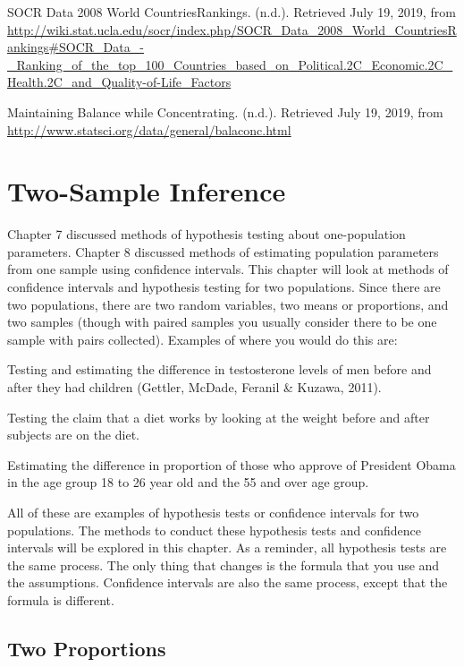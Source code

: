 \documentclass[
]{book}
\begin{document}
SOCR Data 2008 World CountriesRankings. (n.d.). Retrieved July 19, 2019, from \url{http://wiki.stat.ucla.edu/socr/index.php/SOCR_Data_2008_World_CountriesRankings\#SOCR_Data_-_Ranking_of_the_top_100_Countries_based_on_Political.2C_Economic.2C_Health.2C_and_Quality-of-Life_Factors}

Maintaining Balance while Concentrating. (n.d.). Retrieved July 19, 2019, from \url{http://www.statsci.org/data/general/balaconc.html}

\hypertarget{two-sample-inference}{%
\chapter{Two-Sample Inference}\label{two-sample-inference}}

Chapter 7 discussed methods of hypothesis testing about one-population parameters. Chapter 8 discussed methods of estimating population parameters from one sample using confidence intervals. This chapter will look at methods of confidence intervals and hypothesis testing for two populations. Since there are two populations, there are two random variables, two means or proportions, and two samples (though with paired samples you usually consider there to be one sample with pairs collected). Examples of where you would do this are:

Testing and estimating the difference in testosterone levels of men before and after they had children (Gettler, McDade, Feranil \& Kuzawa, 2011).

Testing the claim that a diet works by looking at the weight before and after subjects are on the diet.

Estimating the difference in proportion of those who approve of President Obama in the age group 18 to 26 year old and the 55 and over age group.

All of these are examples of hypothesis tests or confidence intervals for two populations. The methods to conduct these hypothesis tests and confidence intervals will be explored in this chapter. As a reminder, all hypothesis tests are the same process. The only thing that changes is the formula that you use and the assumptions. Confidence intervals are also the same process, except that the formula is different.

\hypertarget{two-proportions}{%
\section{Two Proportions}\label{two-proportions}}
\end{document}
